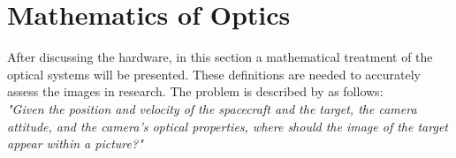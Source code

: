 \section{Mathematics of Optics}
\label{sec:opticsfundamentals}

After discussing the hardware, in this section a mathematical treatment of the optical systems will be presented. These definitions are needed to accurately assess the images in research. The problem is described by \cite{OpNav} as follows:\\

\textit{"Given the position and velocity of the spacecraft and the target, the camera attitude, and the camera’s optical properties, where should the image of the target appear within a picture?"} \\

